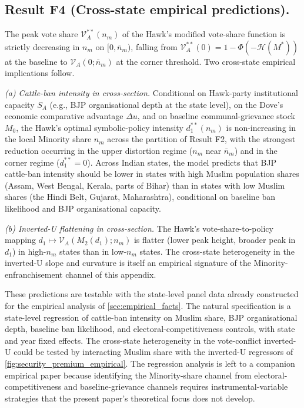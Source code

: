 \documentclass[11pt,twoside]{extarticle}
\begin{document}
\subsection*{Result F4 (Cross-state empirical predictions).} The peak vote share $\mathcal V_A^{**}(n_m)$ of the Hawk's modified vote-share function is strictly decreasing in $n_m$ on $[0,\bar n_m)$, falling from $\mathcal V_A^{**}(0)=1-\Phi(-\mathcal H(M^{*}))$ at the baseline to $\mathcal V_A(0;\bar n_m)$ at the corner threshold. Two cross-state empirical implications follow.

\medskip\noindent\textit{(a) Cattle-ban intensity in cross-section.} Conditional on Hawk-party institutional capacity $S_A$ (e.g., BJP organisational depth at the state level), on the Dove's economic comparative advantage $\Delta u$, and on baseline communal-grievance stock $M_0$, the Hawk's optimal symbolic-policy intensity $d_1^{**}(n_m)$ is non-increasing in the local Minority share $n_m$ across the partition of Result F2, with the strongest reduction occurring in the upper distortion regime ($n_m$ near $\bar n_m$) and in the corner regime ($d_1^{**}=0$). Across Indian states, the model predicts that BJP cattle-ban intensity should be lower in states with high Muslim population shares (Assam, West Bengal, Kerala, parts of Bihar) than in states with low Muslim shares (the Hindi Belt, Gujarat, Maharashtra), conditional on baseline ban likelihood and BJP organisational capacity.

\medskip\noindent\textit{(b) Inverted-U flattening in cross-section.} The Hawk's vote-share-to-policy mapping $d_1\mapsto\mathcal V_A(M_2(d_1);n_m)$ is flatter (lower peak height, broader peak in $d_1$) in high-$n_m$ states than in low-$n_m$ states. The cross-state heterogeneity in the inverted-U slope and curvature is itself an empirical signature of the Minority-enfranchisement channel of this appendix.

These predictions are testable with the state-level panel data already constructed for the empirical analysis of \autoref{sec:empirical_facts}. The natural specification is a state-level regression of cattle-ban intensity on Muslim share, BJP organisational depth, baseline ban likelihood, and electoral-competitiveness controls, with state and year fixed effects. The cross-state heterogeneity in the vote-conflict inverted-U could be tested by interacting Muslim share with the inverted-U regressors of \autoref{fig:security_premium_empirical}. The regression analysis is left to a companion empirical paper because identifying the Minority-share channel from electoral-competitiveness and baseline-grievance channels requires instrumental-variable strategies that the present paper's theoretical focus does not develop.
\end{document}
